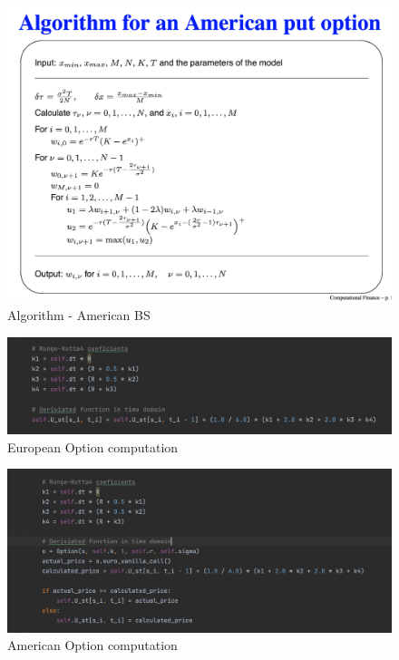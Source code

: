 \documentclass[10pt,a4paper]{article}
\begin{document}
	
	\begin{figure}[H]
		\centering
		\includegraphics[width = 1.0\linewidth]{palczewski.png}
		\caption[Algorithm - American BS]{Algorithm - American BS}
		\label{fig:Al}
	\end{figure}
	
	\begin{figure}[H]
		\centering
		\includegraphics[width = 1.0\linewidth]{european.png}
		\caption[European Option computation]{European Option computation}
		\label{fig:Eu}
	\end{figure}

	\begin{figure}[H]
		\centering
		\includegraphics[width = 1.0\linewidth]{american.png}
		\caption[American Option computation]{American Option computation}
		\label{fig:Am}
	\end{figure}
\end{document}
